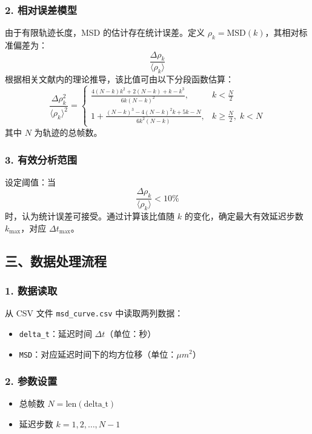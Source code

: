 \documentclass[a4paper]{report} %
\begin{document}
\subsubsection*{2. 相对误差模型}
由于有限轨迹长度，MSD 的估计存在统计误差。定义 $\rho_k = \text{MSD}(k)$，其相对标准偏差为：
\[
\frac{\Delta \rho_k}{\langle \rho_k \rangle}
\]
根据相关文献内的理论推导\cite{qian1991spt}，该比值可由以下分段函数估算：
\[
\frac{\Delta \rho_k^2}{\langle \rho_k \rangle^2} =
\begin{cases}
\displaystyle \frac{4(N-k)k^2 + 2(N-k) + k - k^3}{6k(N-k)^2}, & k < \tfrac{N}{2} \\[2ex]
\displaystyle 1 + \frac{(N-k)^3 - 4(N-k)^2 k + 5k - N}{6k^2(N-k)}, & k \geq \tfrac{N}{2},\; k < N
\end{cases}
\]
其中 $N$ 为轨迹的总帧数。

\subsubsection*{3. 有效分析范围}

设定阈值：当 
\[
\frac{\Delta \rho_k}{\langle \rho_k \rangle} < 10\%
\] 
时，认为统计误差可接受。通过计算该比值随 $k$ 的变化，确定最大有效延迟步数 $k_{\text{max}}$，对应 $\Delta t_{\text{max}}$。

\subsection*{三、数据处理流程}

\subsubsection*{1. 数据读取}

从 CSV 文件 \texttt{msd\_curve.csv} 中读取两列数据：
\begin{itemize}
    \item \texttt{delta\_t}：延迟时间 $\Delta t$（单位：秒）
    \item \texttt{MSD}：对应延迟时间下的均方位移（单位：$\mu m^2$）
\end{itemize}

\subsubsection*{2. 参数设置}

\begin{itemize}
    \item 总帧数 $N = \text{len}(\text{delta\_t})$
    \item 延迟步数 $k = 1, 2, \dots, N-1$
\end{itemize}
\end{document}
